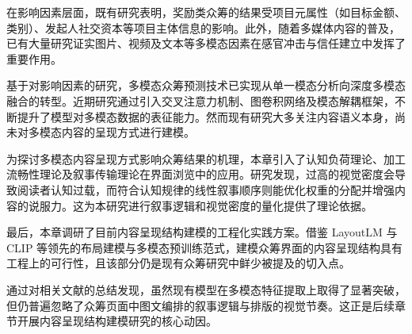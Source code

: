 在影响因素层面，既有研究表明，奖励类众筹的结果受项目元属性（如目标金额、类别）、发起人社交资本等项目主体信息的影响。此外，随着多媒体内容的普及，已有大量研究证实图片、视频及文本等多模态因素在感官冲击与信任建立中发挥了重要作用。

基于对影响因素的研究，多模态众筹预测技术已实现从单一模态分析向深度多模态融合的转型。近期研究通过引入交叉注意力机制、图卷积网络及模态解耦框架，不断提升了模型对多模态数据的表征能力。然而现有研究大多关注内容语义本身，尚未对多模态内容的呈现方式进行建模。

为探讨多模态内容呈现方式影响众筹结果的机理，本章引入了认知负荷理论、加工流畅性理论及叙事传输理论在界面浏览中的应用。研究发现，过高的视觉密度会导致阅读者认知过载，而符合认知规律的线性叙事顺序则能优化权重的分配并增强内容的说服力。这为本研究进行叙事逻辑和视觉密度的量化提供了理论依据。

最后，本章调研了目前内容呈现结构建模的工程化实践方案。借鉴 LayoutLM 与 CLIP 等领先的布局建模与多模态预训练范式，建模众筹界面的内容呈现结构具有工程上的可行性，且该部分仍是现有众筹研究中鲜少被提及的切入点。

通过对相关文献的总结发现，虽然现有模型在多模态特征提取上取得了显著突破，但仍普遍忽略了众筹页面中图文编排的叙事逻辑与排版的视觉节奏。这正是后续章节开展内容呈现结构建模研究的核心动因。
